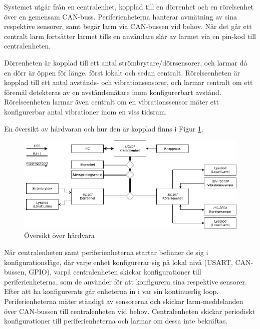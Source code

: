\documentclass{article}
\begin{document}
Systemet utgår från en centralenhet, kopplad till en dörrenhet och en rörelsenhet över en gemensam CAN-buss. Periferienheterna hanterar avmätning av sina respektive sensorer, samt begär larm via CAN-bussen vid behov. När det går ett centralt larm fortsätter larmet tills en användare slår av larmet via en pin-kod till centralenheten.

Dörrenheten är kopplad till ett antal strömbrytare/dörrsensorer, och larmar då en dörr är öppen för länge, först lokalt och sedan centralt.
Rörelseenheten är kopplad till ett antal avstånds- och vibrationsensorer, och larmar centralt om ett föremål detekteras av en avståndsmätare inom konfigurerbart avstånd.
Rörelseenheten larmar även centralt om en vibrationssensor mäter ett konfigurerbar antal vibrationer inom en viss tidsram. %

En översikt av hårdvaran och hur den är kopplad finns i Figur \ref{fig:hårdvara}.
\begin{figure}[H] %
    \centering
    \includegraphics[width=1\textwidth]{figurer/HardvaraOversikt.png}
    \caption{Översikt över hårdvara}
    \label{fig:hårdvara}
\end{figure}

När centralenheten samt periferienheterna startar befinner de sig i konfigurationsläge,
 där varje enhet konfigurerar sig på lokal nivå (USART, CAN-bussen, GPIO), varpå centralenheten skickar konfigurationer till periferienheterna, som de använder för att konfigurera sina respektive sensorer.
 Efter att ha konfigurerats går enheterna in i var sin kontinuerlig loop. Periferienheterna mäter ständigt av sensorerna och skickar larm-meddelanden över CAN-bussen till centralenheten vid behov. Centralenheten skickar periodiskt konfigurationer till periferienheterna och larmar om dessa inte bekräftas.
\end{document}
